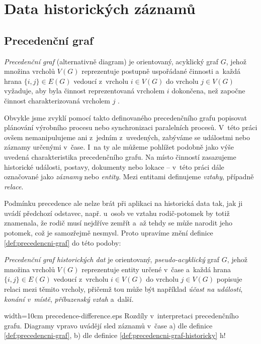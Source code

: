 		
\chapter{Data historických záznamů}
\label{historicka-data}
	\section{Precedenční graf}
		\begin{mydef}
			\label{def:precedencni-graf}
			\emph{Precedenční graf} (alternativně diagram) je orientovaný, acyklický graf $G$, jehož množina vrcholů $V(G)$ reprezentuje postupně uspořádané činnosti a~každá hrana $\{i,j\} \in E(G)$ vedoucí z~vrcholu $i \in V(G)$ do vrcholu $j \in V(G)$ vyžaduje, aby byla činnost reprezentovaná vrcholem $i$ dokončena, než započne činnost charakterizovaná vrcholem $j$ \cite{temple}.
		\end{mydef}
		
		Obvykle jsme zvyklí pomocí takto definovaného precedenčního grafu popisovat plánování výrobního procesu nebo synchronizaci paralelních procesů. V~této práci ovšem nemanipulujeme ani z~jedním z~uvedených, zabýváme se událostmi nebo záznamy určenými v~čase. I~na ty ale můžeme pohlížet podobně jako výše uvedená charakteristika precedenčního grafu. Na místo činností zasazujeme historické události, postavy, dokumenty nebo lokace -- v~této práci dále označované jako \emph{záznamy} nebo \emph{entity}. Mezi entitami definujeme \emph{vztahy}, případně \emph{relace}.
		
		Podmínku precedence ale nelze brát při aplikaci na historická data tak, jak ji uvádí předchozí odstavec, např. u~osob ve vztahu rodič-potomek by totiž znamenala, že rodič musí nejdříve zemřít a~až tehdy se může narodit jeho potomek, což je samozřejmě nesmysl. Proto upravíme znění definice \ref{def:precedencni-graf} do této podoby:
		
		\begin{mydef}
			\label{def:precedencni-graf-historicky}
			\emph{Precedenční graf historických dat} je orientovaný, \emph{pseudo-acyklický} graf $G$, jehož mno\-žina vrcholů $V(G)$ reprezentuje entity určené v~čase a~každá hrana $\{i,j\} \in E(G)$ vedoucí z~vrcholu $i \in V(G)$ do vrcholu $j \in V(G)$ popisuje relaci mezi těmito vrcholy, přičemž tou může být například \emph{účast na události}, \emph{konání v~místě}, \emph{příbuzenský vztah} a~další.
		\end{mydef}
		
		  {width=10cm}
		  {precedence-difference.eps}
		  {Rozdíly v~interpretaci precedenčního grafu. Diagramy vpravo uvádějí sled záznamů v~čase a) dle definice \ref{def:precedencni-graf}, b) dle definice \ref{def:precedencni-graf-historicky}}
		  {h!}
		
